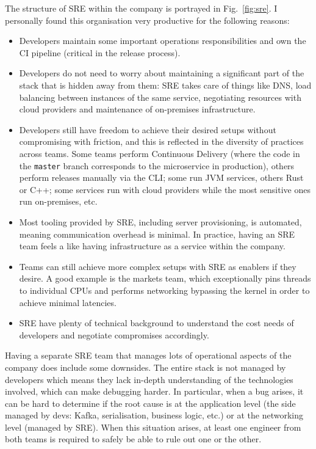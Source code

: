 \documentclass[conference]{IEEEtran}
\begin{document}
    The structure of SRE within the company is portrayed in Fig.~\ref{fig:sre}.
    I personally found this organisation very productive for the following reasons:
    \begin{itemize}
        \item Developers maintain some important operations responsibilities and own the CI pipeline (critical in the release process).
        \item Developers do not need to worry about maintaining a significant part of the stack that is hidden away from them: SRE takes care of things like DNS, load balancing between instances of the same service, negotiating resources with cloud providers and maintenance of on-premises infrastructure.
        \item Developers still have freedom to achieve their desired setups without compromising with friction, and this is reflected in the diversity of practices across teams.
        Some teams perform Continuous Delivery (where the code in the \texttt{master} branch corresponds to the microservice in production), others perform releases manually via the CLI; some run JVM services, others Rust or C++;
        some services run with cloud providers while the most sensitive ones run on-premises, etc.
        \item Most tooling provided by SRE, including server provisioning, is automated, meaning communication overhead is minimal.
        In practice, having an SRE team feels a like having infrastructure as a service within the company.
        \item Teams can still achieve more complex setups with SRE as enablers
        if they desire.
        A good example is the markets team, which exceptionally pins threads to individual CPUs and performs networking bypassing the kernel in order to achieve minimal latencies.
        \item SRE have plenty of technical background to understand the cost needs of developers and negotiate compromises accordingly.
    \end{itemize}

    Having a separate SRE team that manages lots of operational aspects of the company does include some downsides.
    The entire stack is not managed by developers which means they lack in-depth understanding of the technologies involved, which can make debugging harder.
    In particular, when a bug arises, it can be hard to determine if the root cause is at the application level (the side managed by devs: Kafka, serialisation, business logic, etc.) or at the networking level (managed by SRE).
    When this situation arises, at least one engineer from both teams is required to safely be able to rule out one or the other.
\end{document}
